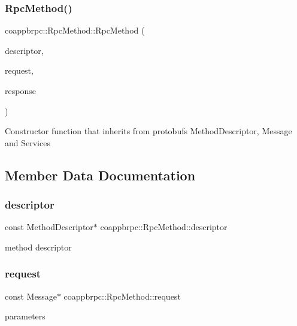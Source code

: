 \subsubsection{\texorpdfstring{Rpc\+Method()}{RpcMethod()}}
{\footnotesize\ttfamily coappbrpc\+::\+Rpc\+Method\+::\+Rpc\+Method (\begin{DoxyParamCaption}\item[{const Method\+Descriptor $\ast$}]{descriptor,  }\item[{const Message $\ast$}]{request,  }\item[{const Message $\ast$}]{response }\end{DoxyParamCaption})\hspace{0.3cm}{\ttfamily [inline]}}

Constructor function that inherits from protobufs Method\+Descriptor, Message and Services 

\subsection{Member Data Documentation}
\mbox{\label{classcoappbrpc_1_1RpcMethod_a52010a290e164174ca969c8904d1f3da}} 
\subsubsection{\texorpdfstring{descriptor}{descriptor}}
{\footnotesize\ttfamily const Method\+Descriptor$\ast$ coappbrpc\+::\+Rpc\+Method\+::descriptor}

method descriptor \mbox{\label{classcoappbrpc_1_1RpcMethod_ac8d0272f2480f41d10c91c023708b8f8}} 
\subsubsection{\texorpdfstring{request}{request}}
{\footnotesize\ttfamily const Message$\ast$ coappbrpc\+::\+Rpc\+Method\+::request}

parameters \mbox{\label{classcoappbrpc_1_1RpcMethod_a95a64db4546c8e418232fafa297fc9a5}} 
